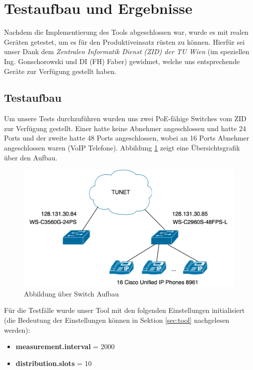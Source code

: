 \section{Testaufbau und Ergebnisse}
\label{sec:test}
Nachdem die Implementierung des Tools abgeschlossen war, wurde es mit realen Geräten getestet, um es für den Produktiveinsatz rüsten zu können. Hierfür sei unser Dank dem \emph{Zentralen Informatik Dienst (ZID) der TU Wien} (im speziellen Ing. Gonschorowski und DI (FH) Faber) gewidmet, welche uns entsprechende Geräte zur Verfügung gestellt haben.

\subsection{Testaufbau}
Um unsere Tests durchzuführen wurden uns zwei PoE-fähige Switches vom ZID zur Verfügung gestellt. Einer hatte keine Abnehmer angeschlossen und hatte 24 Ports und der zweite hatte 48 Ports angeschlossen, wobei an 16 Ports Abnehmer angeschlossen waren (VoIP Telefone). Abbildung \ref{fig:switches} zeigt eine Übersichtsgrafik über den Aufbau.

\begin{figure}[h]
    \centering
    \leavevmode
    \includegraphics[width=1.0\linewidth]{figures/network_diagram}
    \caption{Abbildung über Switch Aufbau}
    \label{fig:switches}
\end{figure}

Für die Testfälle wurde unser Tool mit den folgenden Einstellungen initialisiert (die Bedeutung der Einstellungen können in Sektion \ref{sec:tool} nachgelesen werden):
\begin{itemize}
 \item \textbf{measurement.interval} = 2000
 \item \textbf{distribution.slots} = 10
\end{itemize}

